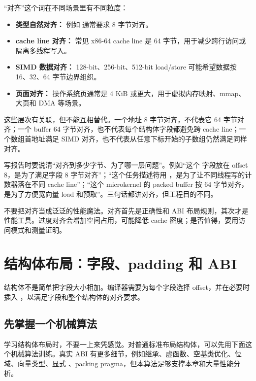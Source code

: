 “对齐”这个词在不同场景里有不同粒度：

\begin{itemize}
  \item \textbf{类型自然对齐：} 例如  通常要求 8 字节对齐。
  \item \textbf{cache line 对齐：} 常见 x86-64 cache line 是 64 字节，用于减少跨行访问或隔离多线程写入。
  \item \textbf{SIMD 数据对齐：} 128-bit、256-bit、512-bit load/store 可能希望数据按 16、32、64 字节边界组织。
  \item \textbf{页面对齐：} 操作系统页通常是 4 KiB 或更大，用于虚拟内存映射、mmap、大页和 DMA 等场景。
\end{itemize}

这些层次有关联，但不能互相替代。一个地址 8 字节对齐，不代表它 64 字节对齐；一个 buffer 64 字节对齐，也不代表每个结构体字段都避免跨 cache line；一个数组首地址满足 SIMD 对齐，也不代表从任意下标开始的子数组仍然满足同样对齐。

写报告时要说清“对齐到多少字节、为了哪一层问题”。例如“这个  字段放在 offset 8，是为了满足字段 8 字节对齐”；“这个任务描述符用 ，是为了让不同线程写的计数器落在不同 cache line”；“这个 microkernel 的 packed buffer 按 64 字节对齐，是为了方便宽向量 load 和预取”。三句话都讲对齐，但工程目的不同。

\begin{warningbox}
不要把对齐当成泛泛的性能魔法。对齐首先是正确性和 ABI 布局规则，其次才是性能工具。过度对齐会增加空间占用，可能降低 cache 密度；是否值得，要用访问模式和测量证明。
\end{warningbox}

\section{结构体布局：字段、padding 和 ABI}

结构体不是简单把字段大小相加。编译器需要为每个字段选择 offset，并在必要时插入 ，以满足字段和整个结构体的对齐要求。

\subsection{先掌握一个机械算法}

学习结构体布局时，不要一上来凭感觉。对普通标准布局结构体，可以先用下面这个机械算法训练。真实 ABI 有更多细节，例如继承、虚函数、空基类优化、位域、向量类型、显式 、packing pragma，但本算法足够支撑本章和大量性能分析。

